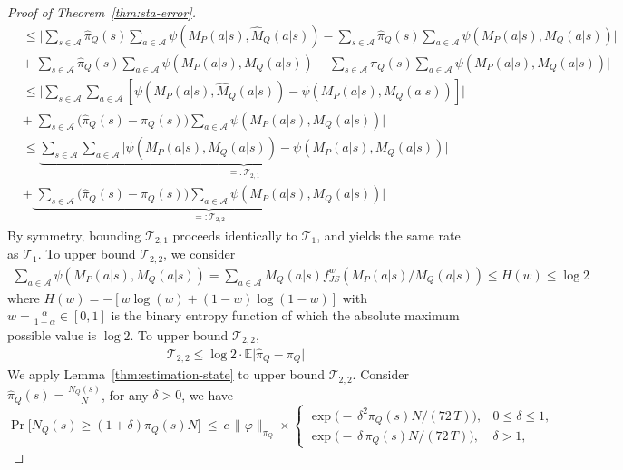 \documentclass{article}
\theoremstyle{plain}
\theoremstyle{definition}
\theoremstyle{remark}
\begin{document}
\begin{proof}[Proof of Theorem~\ref{thm:sta-error}]
\begin{align}
    &\leq \bigg| \sum_{s\in \mathcal{A}} \hat \pi_Q(s) \sum_{a \in \mathcal{A}} \psi (M_P(a|s),\hat M_Q(a|s)) - \sum_{s\in \mathcal{A}} \hat \pi_Q(s) \sum_{a \in \mathcal{A}} \psi (M_P(a|s),M_Q(a|s))\bigg|\nonumber\\&+  \bigg|\sum_{s\in \mathcal{A}} \hat \pi_Q(s) \sum_{a \in \mathcal{A}} \psi (M_P(a|s),M_Q(a|s))- \sum_{s\in \mathcal{A}} \pi_Q(s) \sum_{a \in \mathcal{A}} \psi ( M_P(a|s),  M_Q(a|s)) \bigg| \\
        & \leq  \bigg|\sum_{s\in \mathcal{A}}\sum_{a\in \mathcal{A}}[\psi ( M_P(a|s),\hat M_Q(a|s))-\psi ( M_P(a|s),M_Q(a|s)) ] \bigg| \nonumber\\& +  \bigg| \sum_{s\in \mathcal{A}}\big(\hat \pi_Q(s)-\pi_Q(s)\big)\sum_{a\in \mathcal{A}}\psi ( M_P(a|s),M_Q(a|s))\bigg| \\
         & \leq \underbrace{\sum_{s\in \mathcal{A}}\sum_{a\in \mathcal{A}} \bigg|\psi ( M_P(a|s),\hat M_Q(a|s))-\psi ( M_P(a|s),M_Q(a|s))  \bigg| }_{=:\mathcal{T}_{2,1}}\nonumber\\& + \underbrace{ \bigg| \sum_{s\in \mathcal{A}}\big(\hat \pi_Q(s)-\pi_Q(s)\big)\sum_{a\in \mathcal{A}}\psi ( M_P(a|s),M_Q(a|s))\bigg|}_{=:\mathcal{T}_{2,2}}
\end{align}
By symmetry, bounding $\mathcal{T}_{2,1}$ proceeds identically to $\mathcal{T}_{1}$, and yields the same rate as $\mathcal{T}_{1}$. To upper bound $\mathcal{T}_{2,2}$, we consider 
\begin{align}
    \sum_{a\in \mathcal{A}}\psi ( M_P(a|s),M_Q(a|s)) =  \sum_{a\in \mathcal{A}} M_Q(a|s)f_{JS}^w(M_P(a|s)/M_Q(a|s)) \le H(w) \le \log 2
\end{align}
where $H(w)=-[w\log(w)+(1-w)\log (1-w)]$ with $w=\frac{\alpha}{1+\alpha}\in[0,1]$ is the binary entropy function of which the absolute maximum possible value is $\log 2$. To upper bound $\mathcal{T}_{2,2}$,
\begin{align}
    \mathcal{T}_{2,2} \leq \log 2 \cdot \mathbb E \big| \hat \pi_Q-\pi_Q\big|
\end{align}
We apply Lemma~\ref{thm:estimation-state} to upper bound $\mathcal{T}_{2,2}$. Consider $\hat \pi_Q(s)=\frac{N_Q(s)}{N}$, for any $\delta>0$, we have 
\[
\Pr\!\big[N_Q(s) \ge (1+\delta)\pi_Q(s) N\big]
\ \le\
c\,\|\varphi\|_{\pi_Q}\times
\begin{cases}
\exp\!\big(-\,\delta^{2}\pi_Q(s) N/(72\,T)\big), & 0\le \delta \le 1,\\[4pt]
\exp\!\big(-\,\delta\,\pi_Q(s)N/(72\,T)\big), & \delta>1,
\end{cases}
\]
\end{proof}
\end{document}
